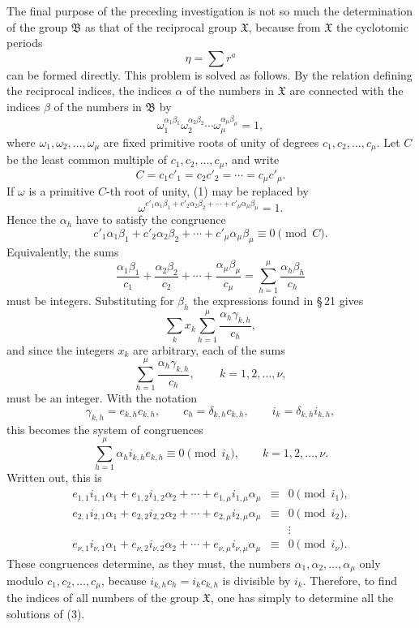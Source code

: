 \documentclass[11pt]{article}
\providecommand{\grpB}{\mathfrak B}
\providecommand{\grpX}{\mathfrak X}
\begin{document}
The final purpose of the preceding investigation is not so much the determination of the group $\grpB$ as that of the reciprocal group $\grpX$, because from $\grpX$ the cyclotomic periods
\[
   \eta=\sum r^a
\]
can be formed directly.  This problem is solved as follows.  By the relation defining the reciprocal indices, the indices $\alpha$ of the numbers in $\grpX$ are connected with the indices $\beta$ of the numbers in $\grpB$ by
\begin{equation}
  \omega_1^{\alpha_1\beta_1}\omega_2^{\alpha_2\beta_2}\cdots
  \omega_\mu^{\alpha_\mu\beta_\mu}=1,
  \tag{1}
\end{equation}
where $\omega_1,\omega_2,\ldots,\omega_\mu$ are fixed primitive roots of unity of degrees $c_1,c_2,\ldots,c_\mu$.  Let $C$ be the least common multiple of $c_1,c_2,\ldots,c_\mu$, and write
\begin{equation}
  C=c_1c'_1=c_2c'_2=\cdots=c_\mu c'_\mu .
  \tag{2}
\end{equation}
If $\omega$ is a primitive $C$-th root of unity, (1) may be replaced by
\[
   \omega^{c'_1\alpha_1\beta_1+c'_2\alpha_2\beta_2+\cdots+c'_\mu\alpha_\mu\beta_\mu}=1.
\]
Hence the $\alpha_h$ have to satisfy the congruence
\[
   c'_1\alpha_1\beta_1+c'_2\alpha_2\beta_2+
   \cdots+c'_\mu\alpha_\mu\beta_\mu\equiv0\pmod C.
\]
Equivalently, the sums
\[
   \frac{\alpha_1\beta_1}{c_1}+\frac{\alpha_2\beta_2}{c_2}+
   \cdots+\frac{\alpha_\mu\beta_\mu}{c_\mu}
   =\sum_{h=1}^{\mu}\frac{\alpha_h\beta_h}{c_h}
\]
must be integers.  Substituting for $\beta_h$ the expressions found in \S\,21 gives
\[
   \sum_k x_k\sum_{h=1}^{\mu}\frac{\alpha_h\gamma_{k,h}}{c_h},
\]
and since the integers $x_k$ are arbitrary, each of the sums
\[
   \sum_{h=1}^{\mu}\frac{\alpha_h\gamma_{k,h}}{c_h},
   \,\qquad k=1,2,\ldots,\nu,
\]
must be an integer.  With the notation
\[
   \gamma_{k,h}=e_{k,h}c_{k,h},\qquad
   c_h=\delta_{k,h}c_{k,h},\qquad
   i_k=\delta_{k,h}i_{k,h},
\]
this becomes the system of congruences
\begin{equation}
   \sum_{h=1}^{\mu} \alpha_h i_{k,h}e_{k,h}\equiv0\pmod {i_k},
   \qquad k=1,2,\ldots,\nu .
   \tag{3}
\end{equation}
Written out, this is
\[
\begin{array}{rcl}
 e_{1,1}i_{1,1}\alpha_1+e_{1,2}i_{1,2}\alpha_2+
     \cdots+e_{1,\mu}i_{1,\mu}\alpha_\mu&\equiv&0\pmod {i_1},\\
 e_{2,1}i_{2,1}\alpha_1+e_{2,2}i_{2,2}\alpha_2+
     \cdots+e_{2,\mu}i_{2,\mu}\alpha_\mu&\equiv&0\pmod {i_2},\\
 &&\vdots\\
 e_{\nu,1}i_{\nu,1}\alpha_1+e_{\nu,2}i_{\nu,2}\alpha_2+
     \cdots+e_{\nu,\mu}i_{\nu,\mu}\alpha_\mu&\equiv&0\pmod {i_\nu}.
\end{array}
\]
These congruences determine, as they must, the numbers
$\alpha_1,\alpha_2,\ldots,\alpha_\mu$ only modulo $c_1,c_2,\ldots,c_\mu$, because $i_{k,h}c_h=i_kc_{k,h}$ is divisible by $i_k$.  Therefore, to find the indices of all numbers of the group $\grpX$, one has simply to determine all the solutions of (3).
\end{document}
